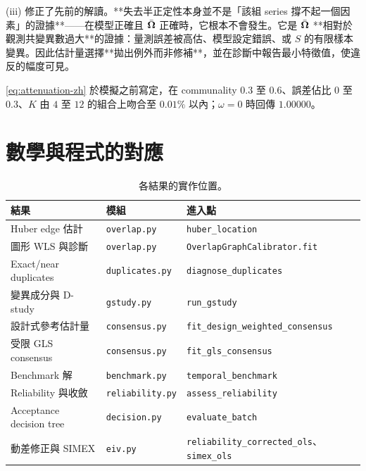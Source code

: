 \documentclass[12pt,a4paper,oneside]{article}
\begin{document}
\begin{remark}[校正後共變異數非正定究竟代表什麼]
(iii) 修正了先前的解讀。**失去半正定性本身並不是「該組 series 撐不起一個因素」的證據**——在模型正確且 $\bar{\bm{\Omega}}$ 正確時，它根本不會發生。它是 $\bar{\bm{\Omega}}$ **相對於觀測共變異數過大**的證據：量測誤差被高估、模型設定錯誤、或 $S$ 的有限樣本變異。因此估計量選擇**拋出例外而非修補**，並在診斷中報告最小特徵值，使違反的幅度可見。
\end{remark}

\begin{remark}[數值檢驗]
\eqref{eq:attenuation-zh} 於模擬之前寫定，在 communality $0.3$ 至 $0.6$、誤差佔比 $0$ 至 $0.3$、$K$ 由 $4$ 至 $12$ 的組合上吻合至 $0.01\%$ 以內；$\omega=0$ 時回傳 $1.00000$。
\end{remark}

\section{數學與程式的對應}

\begin{table}[H]
\centering
\small
\caption{各結果的實作位置。}
\begin{tabularx}{\textwidth}{llX}
\toprule
結果 & 模組 & 進入點\\
\midrule
Huber edge 估計 & \texttt{overlap.py} & \texttt{huber\_location}\\
圖形 WLS 與診斷 & \texttt{overlap.py} & \texttt{OverlapGraphCalibrator.fit}\\
Exact/near duplicates & \texttt{duplicates.py} & \texttt{diagnose\_duplicates}\\
變異成分與 D-study & \texttt{gstudy.py} & \texttt{run\_gstudy}\\
設計式參考估計量 & \texttt{consensus.py} & \texttt{fit\_design\_weighted\_consensus}\\
受限 GLS consensus & \texttt{consensus.py} & \texttt{fit\_gls\_consensus}\\
Benchmark 解 & \texttt{benchmark.py} & \texttt{temporal\_benchmark}\\
Reliability 與收斂 & \texttt{reliability.py} & \texttt{assess\_reliability}\\
Acceptance decision tree & \texttt{decision.py} & \texttt{evaluate\_batch}\\
動差修正與 SIMEX & \texttt{eiv.py} & \texttt{reliability\_corrected\_ols}、\texttt{simex\_ols}\\
\bottomrule
\end{tabularx}
\end{table}
\end{document}
